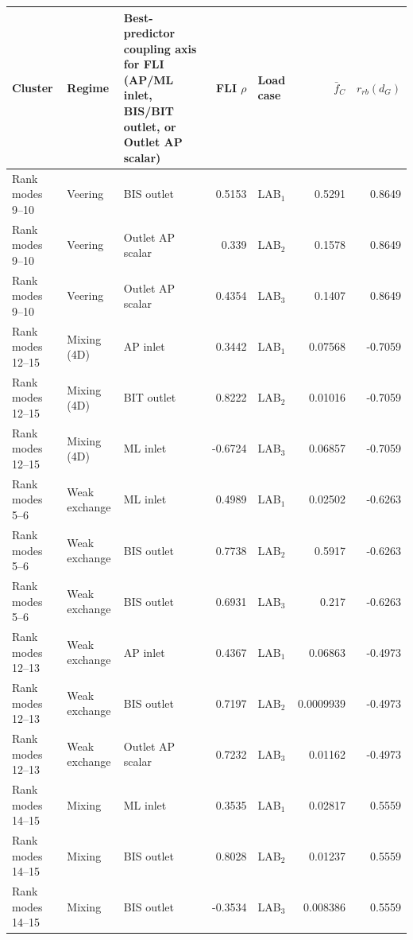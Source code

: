 \begin{tabular}{lllrlrr}
\toprule
Cluster & Regime & Best-predictor coupling axis for FLI (AP/ML inlet, BIS/BIT outlet, or Outlet AP scalar) & FLI $\rho$ & Load case & $\bar f_C$ & $r_{rb}(d_G)$ \\
\midrule
Rank modes 9--10 & Veering & BIS outlet & 0.5153 & LAB$_1$ & 0.5291 & 0.8649 \\
Rank modes 9--10 & Veering & Outlet AP scalar & 0.339 & LAB$_2$ & 0.1578 & 0.8649 \\
Rank modes 9--10 & Veering & Outlet AP scalar & 0.4354 & LAB$_3$ & 0.1407 & 0.8649 \\
Rank modes 12--15 & Mixing (4D) & AP inlet & 0.3442 & LAB$_1$ & 0.07568 & -0.7059 \\
Rank modes 12--15 & Mixing (4D) & BIT outlet & 0.8222 & LAB$_2$ & 0.01016 & -0.7059 \\
Rank modes 12--15 & Mixing (4D) & ML inlet & -0.6724 & LAB$_3$ & 0.06857 & -0.7059 \\
Rank modes 5--6 & Weak exchange & ML inlet & 0.4989 & LAB$_1$ & 0.02502 & -0.6263 \\
Rank modes 5--6 & Weak exchange & BIS outlet & 0.7738 & LAB$_2$ & 0.5917 & -0.6263 \\
Rank modes 5--6 & Weak exchange & BIS outlet & 0.6931 & LAB$_3$ & 0.217 & -0.6263 \\
Rank modes 12--13 & Weak exchange & AP inlet & 0.4367 & LAB$_1$ & 0.06863 & -0.4973 \\
Rank modes 12--13 & Weak exchange & BIS outlet & 0.7197 & LAB$_2$ & 0.0009939 & -0.4973 \\
Rank modes 12--13 & Weak exchange & Outlet AP scalar & 0.7232 & LAB$_3$ & 0.01162 & -0.4973 \\
Rank modes 14--15 & Mixing & ML inlet & 0.3535 & LAB$_1$ & 0.02817 & 0.5559 \\
Rank modes 14--15 & Mixing & BIS outlet & 0.8028 & LAB$_2$ & 0.01237 & 0.5559 \\
Rank modes 14--15 & Mixing & BIS outlet & -0.3534 & LAB$_3$ & 0.008386 & 0.5559 \\
\bottomrule
\end{tabular}
